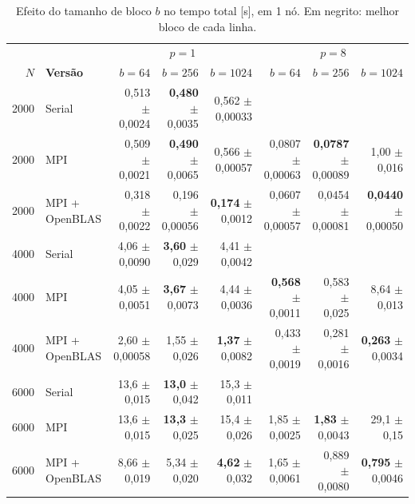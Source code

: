 \documentclass[Portugues]{ic-tese-v3}
\DeclareRobustCommand{\_}{\textunderscore\allowbreak} %
\begin{document}
\begin{table}[H]
\centering\footnotesize
\renewcommand{\arraystretch}{1.05}\setlength{\tabcolsep}{2.5pt}
\begin{tabular}{|r|l|r|r|r|r|r|r|}
\hline
 & & \multicolumn{3}{c|}{\textbf{$p=1$}} & \multicolumn{3}{c|}{\textbf{$p=8$}} \\
\textbf{$N$} & \textbf{Versão} & \textbf{$b=64$} & \textbf{$b=256$} & \textbf{$b=1024$} & \textbf{$b=64$} & \textbf{$b=256$} & \textbf{$b=1024$} \\
\hline\hline
2000 & Serial & 0,513 $\pm$ 0,0024 & \textbf{0,480} $\pm$ 0,0035 & 0,562 $\pm$ 0,00033 &  &  &  \\ \hline
2000 & MPI & 0,509 $\pm$ 0,0021 & \textbf{0,490} $\pm$ 0,0065 & 0,566 $\pm$ 0,00057 & 0,0807 $\pm$ 0,00063 & \textbf{0,0787} $\pm$ 0,00089 & 1,00 $\pm$ 0,016 \\ \hline
2000 & MPI + OpenBLAS & 0,318 $\pm$ 0,0022 & 0,196 $\pm$ 0,00056 & \textbf{0,174} $\pm$ 0,0012 & 0,0607 $\pm$ 0,00057 & 0,0454 $\pm$ 0,00081 & \textbf{0,0440} $\pm$ 0,00050 \\ \hline\hline
4000 & Serial & 4,06 $\pm$ 0,0090 & \textbf{3,60} $\pm$ 0,029 & 4,41 $\pm$ 0,0042 &  &  &  \\ \hline
4000 & MPI & 4,05 $\pm$ 0,0051 & \textbf{3,67} $\pm$ 0,0073 & 4,44 $\pm$ 0,0036 & \textbf{0,568} $\pm$ 0,0011 & 0,583 $\pm$ 0,025 & 8,64 $\pm$ 0,013 \\ \hline
4000 & MPI + OpenBLAS & 2,60 $\pm$ 0,00058 & 1,55 $\pm$ 0,026 & \textbf{1,37} $\pm$ 0,0082 & 0,433 $\pm$ 0,0019 & 0,281 $\pm$ 0,0016 & \textbf{0,263} $\pm$ 0,0034 \\ \hline\hline
6000 & Serial & 13,6 $\pm$ 0,015 & \textbf{13,0} $\pm$ 0,042 & 15,3 $\pm$ 0,011 &  &  &  \\ \hline
6000 & MPI & 13,6 $\pm$ 0,015 & \textbf{13,3} $\pm$ 0,025 & 15,4 $\pm$ 0,026 & 1,85 $\pm$ 0,0025 & \textbf{1,83} $\pm$ 0,0043 & 29,1 $\pm$ 0,15 \\ \hline
6000 & MPI + OpenBLAS & 8,66 $\pm$ 0,019 & 5,34 $\pm$ 0,020 & \textbf{4,62} $\pm$ 0,032 & 1,65 $\pm$ 0,0061 & 0,889 $\pm$ 0,0080 & \textbf{0,795} $\pm$ 0,0046 \\ \hline
\end{tabular}
\caption{Efeito do tamanho de bloco $b$ no tempo total [s], em 1 nó. Em negrito: melhor bloco de cada linha.}
\label{tab:blocos}
\end{table}
\end{document}
